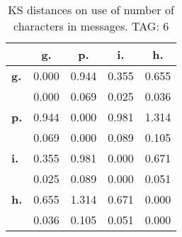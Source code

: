 \begin{table}[h!]
\begin{center}
\begin{tabular}{| l || c | c | c | c |}\hline
 & {\bf g.} & {\bf p.} & {\bf i.} & {\bf h.} \\\hline\hline
{\bf g.} & 0.000 & 0.944 & 0.355 & 0.655 \\
{\bf } & 0.000 & 0.069 & 0.025 & 0.036 \\\hline
{\bf p.} & 0.944 & 0.000 & 0.981 & 1.314 \\
{\bf } & 0.069 & 0.000 & 0.089 & 0.105 \\\hline
{\bf i.} & 0.355 & 0.981 & 0.000 & 0.671 \\
{\bf } & 0.025 & 0.089 & 0.000 & 0.051 \\\hline
{\bf h.} & 0.655 & 1.314 & 0.671 & 0.000 \\
{\bf } & 0.036 & 0.105 & 0.051 & 0.000 \\\hline
\end{tabular}
\caption{KS distances on use of number of characters in messages. TAG: 6}
\end{center}
\end{table}